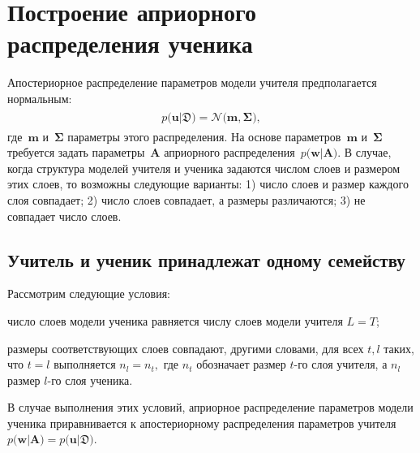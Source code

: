 \documentclass[12pt]{a&t}
\begin{document}
\section{Построение априорного распределения ученика}
Апостериорное распределение параметров модели учителя предполагается нормальным:
\begin{gather}
\label{eq:ap:1}
\begin{aligned}
p\bigr(\mathbf{u}|\mathfrak{D}\bigr) = \mathcal{N}\bigr(\mathbf{m}, \bm{\Sigma}\bigr),
\end{aligned}
\end{gather}
где~$\mathbf{m}$ и~$\bm{\Sigma}$ параметры этого распределения. На основе параметров~$\mathbf{m}$ и~$\bm{\Sigma}$ требуется задать параметры~$\mathbf{A}$ априорного распределения~$p\bigr(\mathbf{w}|\mathbf{A}\bigr).$
В случае, когда структура моделей учителя и ученика задаются числом слоев и размером этих слоев, то возможны следующие варианты: 1) число слоев и размер каждого слоя совпадает; 2) число слоев совпадает, а размеры различаются; 3) не совпадает число слоев.

\subsection{Учитель и ученик принадлежат одному семейству}
\label{section:one:space}
Рассмотрим следующие условия:
\begin{enumlist}
    \item число слоев модели ученика равняется числу слоев модели учителя $L=T$;
    \item размеры соответствующих слоев совпадают, другими словами, для всех $t, l$ таких, что $t=l$ выполняется $n_l = n_t,$ где $n_t$ обозначает размер $t$-го слоя учителя, а $n_l$ размер $l$-го слоя ученика.
\end{enumlist}
В случае выполнения этих условий, априорное распределение параметров модели ученика приравнивается к апостериорному распределения параметров учителя $p\bigr(\mathbf{w}|\mathbf{A}\bigr) = p\bigr(\mathbf{u}|\mathfrak{D}\bigr)$.
\end{document}
